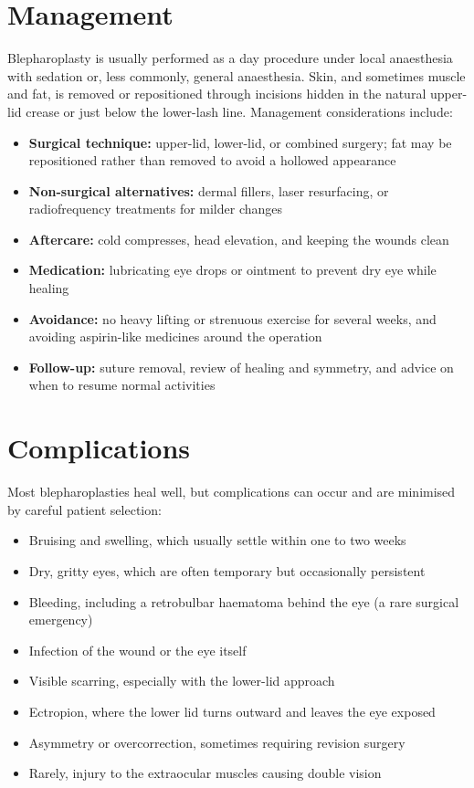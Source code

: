 \section*{Management}
Blepharoplasty is usually performed as a day procedure under local anaesthesia with sedation or, less commonly, general anaesthesia. Skin, and sometimes muscle and fat, is removed or repositioned through incisions hidden in the natural upper-lid crease or just below the lower-lash line. Management considerations include:

\begin{itemize}
    \item \textbf{Surgical technique:} upper-lid, lower-lid, or combined surgery; fat may be repositioned rather than removed to avoid a hollowed appearance
    \item \textbf{Non-surgical alternatives:} dermal fillers, laser resurfacing, or radiofrequency treatments for milder changes
    \item \textbf{Aftercare:} cold compresses, head elevation, and keeping the wounds clean
    \item \textbf{Medication:} lubricating eye drops or ointment to prevent dry eye while healing
    \item \textbf{Avoidance:} no heavy lifting or strenuous exercise for several weeks, and avoiding aspirin-like medicines around the operation
    \item \textbf{Follow-up:} suture removal, review of healing and symmetry, and advice on when to resume normal activities
\end{itemize}

\section*{Complications}
Most blepharoplasties heal well, but complications can occur and are minimised by careful patient selection:

\begin{itemize}
    \item Bruising and swelling, which usually settle within one to two weeks
    \item Dry, gritty eyes, which are often temporary but occasionally persistent
    \item Bleeding, including a retrobulbar haematoma behind the eye (a rare surgical emergency)
    \item Infection of the wound or the eye itself
    \item Visible scarring, especially with the lower-lid approach
    \item Ectropion, where the lower lid turns outward and leaves the eye exposed
    \item Asymmetry or overcorrection, sometimes requiring revision surgery
    \item Rarely, injury to the extraocular muscles causing double vision
\end{itemize}

